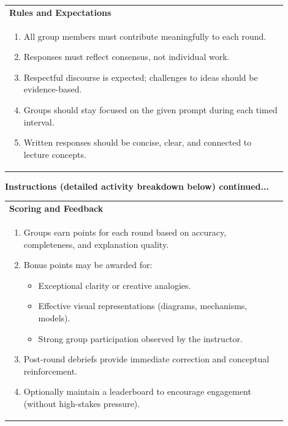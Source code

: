 \documentclass{article}
\begin{document}
\vspace{0.5cm}
\noindent
\begin{tabular}{|p{0.9\linewidth}|}
\hline
{\large\textbf{Rules and Expectations}} \\
\begin{enumerate}[label=\alph*.]
    \item All group members must contribute meaningfully to each round.
    \item Responses must reflect consensus, not individual work.
    \item Respectful discourse is expected; challenges to ideas should be evidence-based.
    \item Groups should stay focused on the given prompt during each timed interval.
    \item Written responses should be concise, clear, and connected to lecture concepts.
\end{enumerate} \\
\hline
\end{tabular}
\newpage

\noindent
{\large \textbf{Instructions (detailed activity breakdown below) continued...}} \\
\vspace{0.5cm}
\noindent
\begin{tabular}{|p{0.9\linewidth}|}
\hline
{\large\textbf{Scoring and Feedback}} \\
\begin{enumerate}[label=\alph*.]
    \item Groups earn points for each round based on accuracy, completeness, and explanation quality.
    \item Bonus points may be awarded for:
    \begin{itemize}
        \item Exceptional clarity or creative analogies.
        \item Effective visual representations (diagrams, mechanisms, models).
        \item Strong group participation observed by the instructor.
    \end{itemize}
    \item Post-round debriefs provide immediate correction and conceptual reinforcement.
    \item Optionally maintain a leaderboard to encourage engagement (without high-stakes pressure).
\end{enumerate} \\
\hline
\end{tabular}
\end{document}
